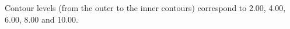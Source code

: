 Contour levels (from the outer to the inner contours) correspond to 2.00, 4.00, 6.00, 8.00 and 10.00.
